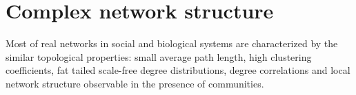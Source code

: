 \documentclass[times, utf8, diplomski]{fer}
\begin{document}
%
%
%
%
%

\chapter{Complex network structure}
\label{structure}
Most of real networks in social and biological systems are characterized by the similar topological properties: small average path length, high clustering coefficients, fat tailed scale-free degree distributions, degree correlations and  local network structure observable in the presence of communities.
\end{document}

